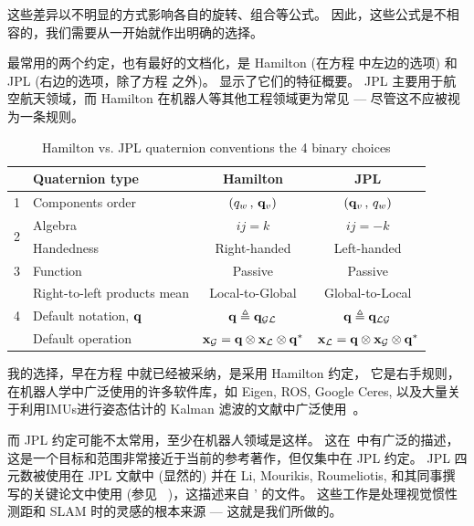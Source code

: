 这些差异以不明显的方式影响各自的旋转、组合等公式。 
因此，这些公式是不相容的，我们需要从一开始就作出明确的选择。

最常用的两个约定，也有最好的文档化，是 Hamilton (在方程  中左边的选项) 和 JPL (右边的选项，除了方程  之外)。
  显示了它们的特征概要。 
JPL 主要用于航空航天领域，而 Hamilton 在机器人等其他工程领域更为常见 --- 尽管这不应被视为一条规则。


\begin{table}
\renewcommand{\arraystretch}{1.3}
\centering
\caption{Hamilton vs. JPL quaternion conventions \wrt the 4 binary choices}
\vspace{1ex}
\begin{tabular}{|cl|c|c|}
\hline
& Quaternion type & Hamilton & JPL \\
\hline\hline
1 & Components order & $(q_w \,,\, {\bf q}_v)$ & $({\bf q}_v \,,\, q_w)$ \\
\hline
\multirow{2}{*}{2} & Algebra & $ij=k$ & $ij=-k$ \\
& Handedness & Right-handed & Left-handed \\
\hline
3 & Function & Passive & Passive
\\
\hline
\multirow{3}{*}{4} & Right-to-left products mean & Local-to-Global & Global-to-Local \\
& Default notation, ${\bf q}$ & ${\bf q} \triangleq {\bf q}_{\mathcal{G}\mathcal{L}}$ & ${\bf q} \triangleq {\bf q}_{\mathcal{L}\mathcal{G}}$ \\
& Default operation & ${\bf x}_{\mathcal{G}} = {\bf q}\otimes{\bf x}_{\mathcal{L}}\otimes{\bf q}^*$ & ${\bf x}_{\mathcal{L}} = {\bf q}\otimes{\bf x}_{\mathcal{G}}\otimes{\bf q}^*$ \\
\hline
\end{tabular}
\label{tab:Hamilton_vs_JPL}
\end{table}

我的选择，早在方程  中就已经被采纳，是采用 Hamilton 约定， 
它是右手规则，在机器人学中广泛使用的许多软件库，如 Eigen, ROS, Google Ceres, 
以及大量关于利用IMUs进行姿态估计的 Kalman 滤波的文献中广泛使用~\citep[还有更多其它的例子]{CHOU-92,KUIPERS-99,PINIES-07,ROUSSILLON-11a,MARTINELLI-12}。

而 JPL 约定可能不太常用，至少在机器人领域是这样。 
这在~\citep{TRAWNY-05-QUAT}中有广泛的描述，这是一个目标和范围非常接近于当前的参考著作，但仅集中在 JPL 约定。 
JPL 四元数被使用在 JPL 文献中 (显然的) 并在 Li, Mourikis, Roumeliotis, 和其同事撰写的关键论文中使用 (参见 \eg~\citep{LI-2012,LI-14})，这描述来自 \citeauthor{TRAWNY-05-QUAT}' 的文件。 
这些工作是处理视觉惯性测距和 SLAM 时的灵感的根本来源 --- 这就是我们所做的。 

